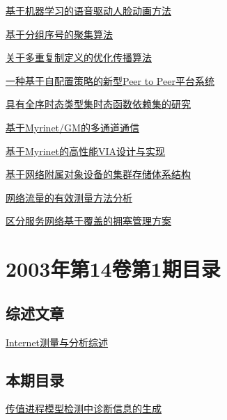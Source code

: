 \documentclass[a4paper]{article}
\begin{document}
\href{http://www.jos.org.cn/ch/reader/download_pdf.aspx?file_no=20030209&year_id=2003&quarter_id=2&falg=1}{基于机器学习的语音驱动人脸动画方法}

\href{http://www.jos.org.cn/ch/reader/download_pdf.aspx?file_no=20030210&year_id=2003&quarter_id=2&falg=1}{基于分组序号的聚集算法}

\href{http://www.jos.org.cn/ch/reader/download_pdf.aspx?file_no=20030211&year_id=2003&quarter_id=2&falg=1}{关于多重复制定义的优化传播算法}

\href{http://www.jos.org.cn/ch/reader/download_pdf.aspx?file_no=20030212&year_id=2003&quarter_id=2&falg=1}{一种基于自配置策略的新型Peer to Peer平台系统}

\href{http://www.jos.org.cn/ch/reader/download_pdf.aspx?file_no=20030213&year_id=2003&quarter_id=2&falg=1}{具有全序时态类型集时态函数依赖集的研究}

\href{http://www.jos.org.cn/ch/reader/download_pdf.aspx?file_no=20030216&year_id=2003&quarter_id=2&falg=1}{基于Myrinet/GM的多通道通信}

\href{http://www.jos.org.cn/ch/reader/download_pdf.aspx?file_no=20030217&year_id=2003&quarter_id=2&falg=1}{基于Myrinet的高性能VIA设计与实现}

\href{http://www.jos.org.cn/ch/reader/download_pdf.aspx?file_no=20030218&year_id=2003&quarter_id=2&falg=1}{基于网络附属对象设备的集群存储体系结构}

\href{http://www.jos.org.cn/ch/reader/download_pdf.aspx?file_no=20030219&year_id=2003&quarter_id=2&falg=1}{网络流量的有效测量方法分析}

\href{http://www.jos.org.cn/ch/reader/download_pdf.aspx?file_no=20030220&year_id=2003&quarter_id=2&falg=1}{区分服务网络基于覆盖的拥塞管理方案}


\section{\textbf{2003年第14卷第1期目录}}
\subsection{综述文章}
\href{http://www.jos.org.cn/ch/reader/download_pdf.aspx?file_no=20030117&year_id=2003&quarter_id=1&falg=1}{Internet测量与分析综述}

\subsection{本期目录}
\href{http://www.jos.org.cn/ch/reader/download_pdf.aspx?file_no=20030101&year_id=2003&quarter_id=1&falg=1}{传值进程模型检测中诊断信息的生成}
\end{document}
